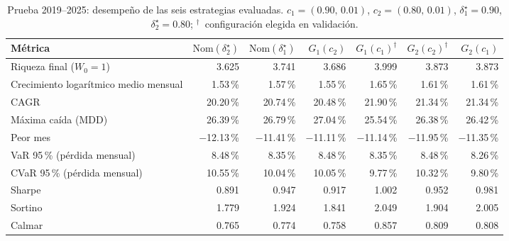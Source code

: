 \begin{table}[h]
\centering
\footnotesize
\setlength{\tabcolsep}{4pt}
\caption{Prueba 2019--2025: desempeño de las seis estrategias evaluadas. $c_1=(0.90,\,0.01)$, $c_2=(0.80,\,0.01)$, $\delta_1^\star=0.90$, $\delta_2^\star=0.80$; $^{\dagger}$~configuración elegida en validación.}\label{tab:r2_a}
\begin{tabular}{|l|r|r|r|r|r|r|}
\hline
\textbf{Métrica} & \textbf{$\mathrm{Nom}(\delta_2^\star)$} & \textbf{$\mathrm{Nom}(\delta_1^\star)$} & \textbf{$G_1(c_2)$} & \textbf{$G_1(c_1)^{\dagger}$} & \textbf{$G_2(c_2)^{\dagger}$} & \textbf{$G_2(c_1)$} \\ \hline
Riqueza final ($W_0=1$) & 3.625 & 3.741 & 3.686 & 3.999 & 3.873 & 3.873 \\ \hline
Crecimiento logarítmico medio mensual & 1.53\,\% & 1.57\,\% & 1.55\,\% & 1.65\,\% & 1.61\,\% & 1.61\,\% \\ \hline
CAGR & 20.20\,\% & 20.74\,\% & 20.48\,\% & 21.90\,\% & 21.34\,\% & 21.34\,\% \\ \hline
Máxima caída (MDD) & 26.39\,\% & 26.79\,\% & 27.04\,\% & 25.54\,\% & 26.38\,\% & 26.42\,\% \\ \hline
Peor mes & $-$12.13\,\% & $-$11.41\,\% & $-$11.11\,\% & $-$11.14\,\% & $-$11.95\,\% & $-$11.35\,\% \\ \hline
VaR 95\,\% (pérdida mensual) & 8.48\,\% & 8.35\,\% & 8.48\,\% & 8.35\,\% & 8.48\,\% & 8.26\,\% \\ \hline
CVaR 95\,\% (pérdida mensual) & 10.55\,\% & 10.04\,\% & 10.05\,\% & 9.77\,\% & 10.32\,\% & 9.80\,\% \\ \hline
Sharpe & 0.891 & 0.947 & 0.917 & 1.002 & 0.952 & 0.981 \\ \hline
Sortino & 1.779 & 1.924 & 1.841 & 2.049 & 1.904 & 2.005 \\ \hline
Calmar & 0.765 & 0.774 & 0.758 & 0.857 & 0.809 & 0.808 \\ \hline
\end{tabular}
\end{table}
